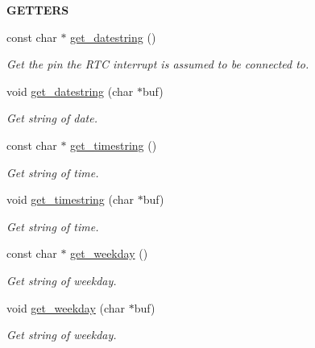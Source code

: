 \begin{Indent}{\bf G\+E\+T\+T\+E\+RS}\par
\begin{DoxyCompactItemize}
\item 
const char $\ast$ \hyperlink{class_loom_r_t_c_a39b290c0f070c99c83e4794d73f145c1}{get\+\_\+datestring} ()
\begin{DoxyCompactList}\small\item\em Get the pin the R\+TC interrupt is assumed to be connected to. \end{DoxyCompactList}\item 
void \hyperlink{class_loom_r_t_c_a358a34b80334df22441db675715d5b14}{get\+\_\+datestring} (char $\ast$buf)
\begin{DoxyCompactList}\small\item\em Get string of date. \end{DoxyCompactList}\item 
const char $\ast$ \hyperlink{class_loom_r_t_c_ad899bf3e07f5fe270addb88fafa22016}{get\+\_\+timestring} ()
\begin{DoxyCompactList}\small\item\em Get string of time. \end{DoxyCompactList}\item 
void \hyperlink{class_loom_r_t_c_a9a14c5f4a347b64c661e4af6eab969dd}{get\+\_\+timestring} (char $\ast$buf)
\begin{DoxyCompactList}\small\item\em Get string of time. \end{DoxyCompactList}\item 
const char $\ast$ \hyperlink{class_loom_r_t_c_a9eaffa2c1d312cf13f5f6b66a7bd6067}{get\+\_\+weekday} ()
\begin{DoxyCompactList}\small\item\em Get string of weekday. \end{DoxyCompactList}\item 
void \hyperlink{class_loom_r_t_c_aeae9084ff1fc9fe0faa81df9c39277fa}{get\+\_\+weekday} (char $\ast$buf)
\begin{DoxyCompactList}\small\item\em Get string of weekday. \end{DoxyCompactList}\end{DoxyCompactItemize}
\end{Indent}
